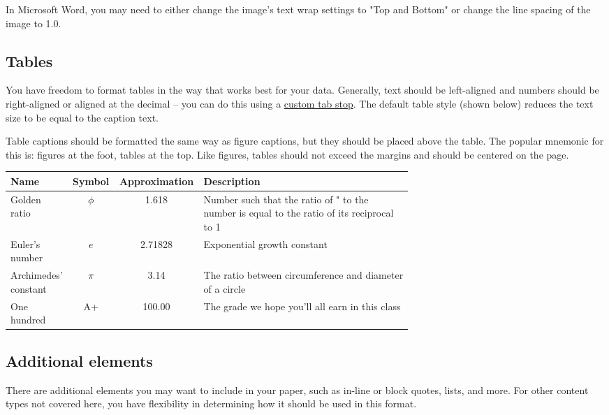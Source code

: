 \documentclass[
	letterpaper, %
]{jdf}
\begin{document}
In Microsoft Word, you may need to either change the image’s text wrap settings to "Top and Bottom" or change the line spacing of the image to 1.0.

\subsection{Tables}
You have freedom to format tables in the way that works best for your data. Generally, text should be left-aligned and numbers should be right-aligned or aligned 
at the decimal – you can do this using a \href{https://practicaltypography.com/tabs-and-tab-stops.html}{custom tab stop}. The default table style (shown below) 
reduces the text size to be equal to the caption text.

Table captions should be formatted the same way as figure captions, but they should be placed above the table. The popular mnemonic for this is: figures at the 
foot, tables at the top. Like figures, tables should not exceed the margins and should be centered on the page.

\begin{jdftable}
\label{table:Example}
\small %
\begin{tabular}{@{} L{0.15\linewidth} c S L{0.52\linewidth}}
	\textbf{Name} & \textbf{Symbol} & \textbf{Approximation} & \textbf{Description} \\
	\toprule[0.5pt]
	Golden ratio & $\phi$ & 1.618 & Number such that the ratio of " to the number is equal to the ratio of its reciprocal to 1\\
	\midrule
	Euler's number & $e$ & 2.71828 & Exponential growth constant\\
	\midrule
	Archimedes' constant & $\pi$ & 3.14 & The ratio between circumference and diameter of a circle\\
	\midrule
	One hundred & A+ & 100.00 & The grade we hope you’ll all earn in this class\\
\end{tabular}
\end{jdftable}

\subsection{Additional elements}
There are additional elements you may want to include in your paper, such as in-line or block quotes, lists, and more. For other content types not covered here, 
you have flexibility in determining how it should be used in this format.
\end{document}
